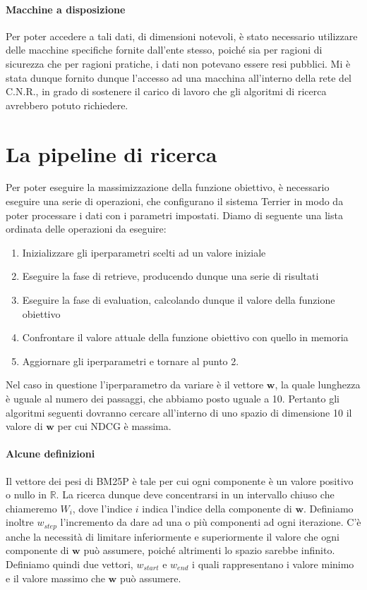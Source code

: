 \paragraph{Macchine a disposizione}
Per poter accedere a tali dati, di dimensioni notevoli, è stato necessario utilizzare
delle macchine specifiche fornite dall'ente stesso, poiché sia per ragioni di sicurezza
che per ragioni pratiche, i dati non potevano essere resi pubblici.
Mi è stata dunque fornito dunque l'accesso ad una macchina 
all'interno della rete del C.N.R., in grado di sostenere il carico
di lavoro che gli algoritmi di ricerca avrebbero potuto richiedere.

\section{La pipeline di ricerca}
Per poter eseguire la massimizzazione della funzione obiettivo,
è necessario eseguire una serie di operazioni, che configurano il sistema Terrier
in modo da poter processare i dati con i parametri impostati.
Diamo di seguente una lista ordinata delle operazioni da eseguire:

\begin{enumerate}
	\item Inizializzare gli iperparametri scelti ad un valore iniziale
	\item Eseguire la fase di retrieve, producendo dunque una serie di risultati
	\item Eseguire la fase di evaluation, calcolando dunque il valore della funzione obiettivo
	\item Confrontare il valore attuale della funzione obiettivo con quello in memoria
	\item Aggiornare gli iperparametri e tornare al punto 2.
\end{enumerate}

Nel caso in questione l'iperparametro da variare è il vettore $\boldsymbol{w}$, la
quale lunghezza è uguale al numero dei passaggi, che abbiamo posto uguale a 10.
Pertanto gli algoritmi seguenti dovranno cercare all'interno di uno spazio di dimensione
10 il valore di $\boldsymbol{w}$ per cui NDCG è massima.

\paragraph{Alcune definizioni}
Il vettore dei pesi di BM25P è tale per cui ogni componente è un valore
positivo o nullo in $\mathbb{R}$. La ricerca dunque deve concentrarsi
in un intervallo chiuso che chiameremo $W_i$, dove l'indice $i$
indica l'indice della componente di $\boldsymbol{w}$.
Definiamo inoltre $w_{step}$ l'incremento da dare ad una o più
componenti ad ogni iterazione.
C'è anche la necessità di limitare inferiormente e superiormente
il valore che ogni componente di $\boldsymbol{w}$ può assumere,
poiché altrimenti lo spazio sarebbe infinito. Definiamo quindi
due vettori, $w_{start}$ e $w_{end}$ i quali rappresentano
i valore minimo e il valore massimo che $\boldsymbol{w}$
può assumere.

